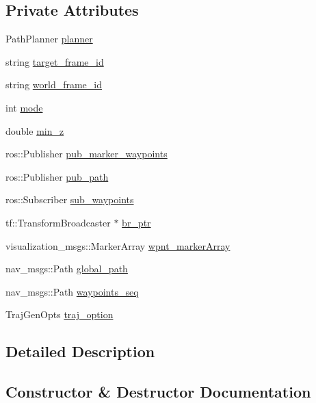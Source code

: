 \subsection*{Private Attributes}
\begin{DoxyCompactItemize}
\item 
Path\+Planner \hyperlink{class_target_manager_a93a451f39ff9c1c19dee2ea20bb0d678}{planner}
\item 
string \hyperlink{class_target_manager_a66612501d5cad51193df0f1adbfc52ed}{target\+\_\+frame\+\_\+id}
\item 
string \hyperlink{class_target_manager_aaab8041311692af50c7e8e3578072df2}{world\+\_\+frame\+\_\+id}
\item 
int \hyperlink{class_target_manager_a98732962b02b1930ed17e043dcaf478b}{mode}
\item 
double \hyperlink{class_target_manager_a4393e564cea5767b9c273fddad4b02b8}{min\+\_\+z}
\item 
ros\+::\+Publisher \hyperlink{class_target_manager_a676ec1f90b5595ac3dcc5c301d132298}{pub\+\_\+marker\+\_\+waypoints}
\item 
ros\+::\+Publisher \hyperlink{class_target_manager_a2aecbfd159c039a048a77601f4351504}{pub\+\_\+path}
\item 
ros\+::\+Subscriber \hyperlink{class_target_manager_ac8faa88743fb19a256daf68d68e081fb}{sub\+\_\+waypoints}
\item 
tf\+::\+Transform\+Broadcaster $\ast$ \hyperlink{class_target_manager_aa7eaef55d0b3b81ea1e72026730c5fd6}{br\+\_\+ptr}
\item 
visualization\+\_\+msgs\+::\+Marker\+Array \hyperlink{class_target_manager_afe26632f7b5444f6922016175b5c1a94}{wpnt\+\_\+marker\+Array}
\item 
nav\+\_\+msgs\+::\+Path \hyperlink{class_target_manager_a6e89e221ecb8f81b9ab9943870a661c3}{global\+\_\+path}
\item 
nav\+\_\+msgs\+::\+Path \hyperlink{class_target_manager_adde18a55a5e093c08584f625e76a0c9e}{waypoints\+\_\+seq}
\item 
Traj\+Gen\+Opts \hyperlink{class_target_manager_aedeaed09b33f06298fc63d0a87df0f37}{traj\+\_\+option}
\end{DoxyCompactItemize}


\subsection{Detailed Description}


\subsection{Constructor \& Destructor Documentation}
